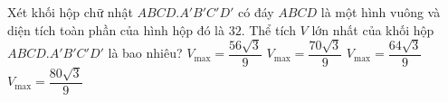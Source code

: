 	\begin{ex}%
		Xét khối hộp chữ nhật $ABCD.A'B'C'D'$ có đáy $ABCD$ là một hình vuông và diện tích toàn phần của hình hộp đó là $32$. Thể tích $V$ lớn nhất của khối hộp $ABCD.A'B'C'D'$ là bao nhiêu?
		\choice
		{$V_{\max}=\dfrac{56\sqrt{3}}{9}$}
		{$V_{\max}=\dfrac{70\sqrt{3}}{9}$}
		{\True $V_{\max}=\dfrac{64\sqrt{3}}{9}$}
		{$V_{\max}=\dfrac{80\sqrt{3}}{9}$}
	\end{ex}
	
